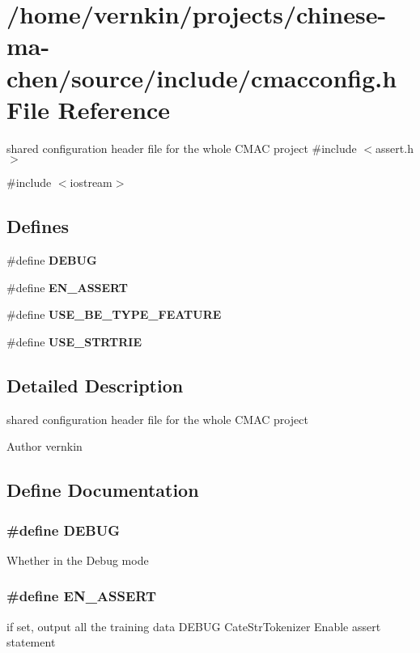 \section{/home/vernkin/projects/chinese-\/ma-\/chen/source/include/cmacconfig.h File Reference}
\label{cmacconfig_8h}


shared configuration header file for the whole CMAC project  
{\ttfamily \#include $<$assert.h$>$}\par
{\ttfamily \#include $<$iostream$>$}\par
\subsection*{Defines}
\begin{DoxyCompactItemize}
\item 
\#define {\bf DEBUG}
\item 
\#define {\bf EN\_\-ASSERT}
\item 
\#define {\bf USE\_\-BE\_\-TYPE\_\-FEATURE}
\item 
\#define {\bf USE\_\-STRTRIE}
\end{DoxyCompactItemize}


\subsection{Detailed Description}
shared configuration header file for the whole CMAC project \begin{DoxyAuthor}{Author}
vernkin 
\end{DoxyAuthor}


\subsection{Define Documentation}
\subsubsection[{DEBUG}]{\setlength{\rightskip}{0pt plus 5cm}\#define DEBUG}\label{cmacconfig_8h_ad72dbcf6d0153db1b8d8a58001feed83}
Whether in the Debug mode 
\subsubsection[{EN\_\-ASSERT}]{\setlength{\rightskip}{0pt plus 5cm}\#define EN\_\-ASSERT}\label{cmacconfig_8h_a126df696f0f6a8d1ec5ab4bf14b20054}
if set, output all the training data DEBUG CateStrTokenizer Enable assert statement 
